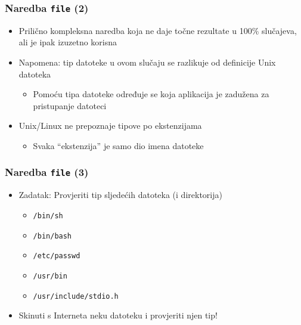 \documentclass{beamer}
\newcommand{\shell}[1]{\texttt{#1}}
\begin{document}
\begin{frame}[t]
\frametitle{Naredba \shell{file} (2)}
\begin{itemize}
  \item Prilično kompleksna naredba koja ne daje točne rezultate u 100\% 
        slučajeva, ali je ipak izuzetno korisna 
  \item Napomena: tip datoteke u ovom slučaju se razlikuje od definicije
        Unix datoteka
  \begin{itemize}
    \item Pomoću tipa datoteke određuje se koja aplikacija je zadužena za
          pristupanje datoteci
  \end{itemize}
  \item Unix/Linux ne prepoznaje tipove po ekstenzijama
  \begin{itemize}
    \item Svaka ``ekstenzija'' je samo dio imena datoteke
  \end{itemize}
\end{itemize}
\end{frame}

\begin{frame}[t]
\frametitle{Naredba \shell{file} (3)}
\begin{itemize}
  \item Zadatak: Provjeriti tip sljedećih datoteka (i direktorija)
  \begin{itemize}
    \item[] \shell{/bin/sh}
    \item[] \shell{/bin/bash}
    \item[] \shell{/etc/passwd}
    \item[] \shell{/usr/bin}
    \item[] \shell{/usr/include/stdio.h}
  \end{itemize}
  \item Skinuti s Interneta neku datoteku i provjeriti njen tip!
\end{itemize}
\end{frame}
    
\end{document}
